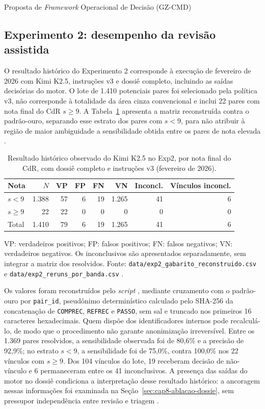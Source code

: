 \begin{chapter}{Proposta de \textit{Framework} Operacional de Decisão (GZ-CMD)}
\subsection{Experimento 2: desempenho da revisão assistida}
\label{sec:cap8-exp2}

O resultado histórico do Experimento 2 corresponde à execução de fevereiro de 2026 com Kimi K2.5, instruções v3 e dossiê completo, incluindo as saídas decisórias do motor. O lote de 1.410 potenciais pares foi selecionado pela política v3, não corresponde à totalidade da área cinza convencional e inclui 22 pares com nota final do CdR $s\geq9$. A Tabela~\ref{tab:cap8-revisao-desempenho} apresenta a matriz reconstruída contra o padrão-ouro, separando esse estrato dos pares com $s<9$, para não atribuir à região de maior ambiguidade a sensibilidade obtida entre os pares de nota elevada \cite{Jardim2026phdrepo}.

\begin{table}[!ht]
\centering
\caption{Resultado histórico observado do Kimi K2.5 no Exp2, por nota final do CdR, com dossiê completo e instruções v3 (fevereiro de 2026).}
\label{tab:cap8-revisao-desempenho}
\begin{tabular}{lrrrrrrr}
\hline
Nota & $N$ & VP & FP & FN & VN & Inconcl. & Vínculos inconcl. \\
\hline
$s<9$ & 1.388 & 57 & 6 & 19 & 1.265 & 41 & 6 \\
$s\geq9$ & 22 & 22 & 0 & 0 & 0 & 0 & 0 \\
Total & 1.410 & 79 & 6 & 19 & 1.265 & 41 & 6 \\
\hline
\end{tabular}%
\par\smallskip
\parbox{\linewidth}{\footnotesize VP: verdadeiros positivos; FP: falsos positivos; FN: falsos negativos; VN: verdadeiros negativos. Os inconclusivos são apresentados separadamente, sem integrar a matriz dos resolvidos. Fonte: \texttt{data/exp2\_gabarito\_reconstruido.csv} e \texttt{data/exp2\_reruns\_por\_banda.csv} \cite{Jardim2026phdrepo}.}
\end{table}

Os valores foram reconstruídos pelo \textit{script} , mediante cruzamento com o padrão-ouro por \texttt{pair\_id}, pseudônimo determinístico calculado pelo SHA-256 da concatenação de \texttt{COMPREC}, \texttt{REFREC} e \texttt{PASSO}, sem sal e truncado nos primeiros 16 caracteres hexadecimais. Quem dispõe dos identificadores internos pode recalculá-lo, de modo que o procedimento não garante anonimização irreversível. Entre os 1.369 pares resolvidos, a sensibilidade observada foi de 80,6\% e a precisão de 92,9\%; no estrato $s<9$, a sensibilidade foi de 75,0\%, contra 100,0\% nos 22 vínculos com $s\geq9$. Dos 104 vínculos do lote, 19 receberam decisão de não-vínculo e 6 permaneceram entre os 41 inconclusivos. A presença das saídas do motor no dossiê condiciona a interpretação desse resultado histórico: a ancoragem nessas informações foi examinada na Seção~\ref{sec:cap8-ablacao-dossie}, sem pressupor independência entre revisão e triagem \cite{Jardim2026phdrepo}.


\end{chapter}
